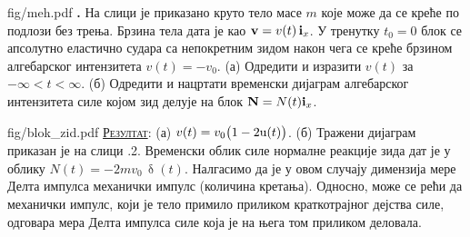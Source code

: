 
\begin{slikaDesno}[.833]{fig/meh.pdf}
\textbf{\ID.} 
На слици је приказано круто тело масе $m$ 
које може да се креће по подлози без трења. 
Брзина тела дата је као ${\bf v} = v(t) \, 
{\bf i}_x$. У тренутку $t_0 = 0$ блок се 
апсолутно еластично судара са 
непокретним зидом након чега 
се креће брзином алгебарског интензитета 
$v(t) = -v_0$. (а) Одредити и 
изразити $v(t)$ за $-\infty< t < \infty$. 
(б) Одредити и нацртати временски дијаграм
алгебарског интензитета  
силе којом зид делује на блок ${\bf N} = N(t) 
{\bf i}_x$.
\end{slikaDesno}
\vspace*{5mm}

\begin{slikaDesno}[1]{fig/blok_zid.pdf}
\hspace*{5mm}
\textsc{\underline{Резултат}}:
(а) $v(t) = v_0 \bigl(1 - 2{\rm u}(t)\bigr)$.
(б) Тражени дијаграм приказан је на слици \ID.2.
Временски облик силе нормалне реакције зида дат је у облику 
$N(t) = -2mv_0 \, \updelta(t)$. Налгасимо да је у овом случају димензија
мере Делта импулса механички импулс (количина кретања). Односно, може се рећи да механички импулс, 
који је тело примило приликом краткотрајног дејства силе, одговара мера Делта импулса силе која је на 
њега том приликом деловала.
\end{slikaDesno}